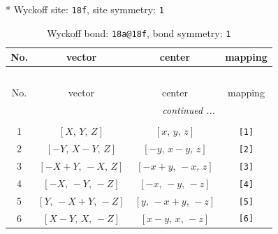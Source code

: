 \documentclass[fleqn,8pt]{jsarticle}
\begin{document}
* Wyckoff site: {\tt 18f}, site symmetry: {\tt 1}
\renewcommand{\arraystretch}{1.2}
\begin{longtable}{cccc}
\caption{Wyckoff bond: {\tt 18a@18f}, bond symmetry: {\tt 1}}
 \\
 \hline \hline
No. & vector & center & mapping \\ \hline \endfirsthead

\multicolumn{3}{l}{\tablename\ \thetable{}} \\
 \hline \hline
No. & vector & center & mapping \\ \hline \endhead

 \hline \hline
\multicolumn{3}{r}{\footnotesize\it continued ...} \\ \endfoot

 \hline \hline
\multicolumn{3}{r}{} \\ \endlastfoot

1 & $\left[ X,\, Y,\, Z \right]$ & $\left[ x,\, y,\, z \right]$ & {\tt [1]} \\ \hline
2 & $\left[ - Y,\, X - Y,\, Z \right]$ & $\left[ - y,\, x - y,\, z \right]$ & {\tt [2]} \\ \hline
3 & $\left[ - X + Y,\, - X,\, Z \right]$ & $\left[ - x + y,\, - x,\, z \right]$ & {\tt [3]} \\ \hline
4 & $\left[ - X,\, - Y,\, - Z \right]$ & $\left[ - x,\, - y,\, - z \right]$ & {\tt [4]} \\ \hline
5 & $\left[ Y,\, - X + Y,\, - Z \right]$ & $\left[ y,\, - x + y,\, - z \right]$ & {\tt [5]} \\ \hline
6 & $\left[ X - Y,\, X,\, - Z \right]$ & $\left[ x - y,\, x,\, - z \right]$ & {\tt [6]} \\
\end{longtable}
\end{document}
